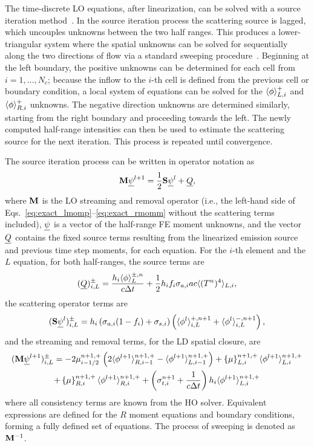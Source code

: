 The time-discrete LO equations, after linearization, can be solved with a source iteration
method~\cite{lewis,morel_dsa,mcclarren_notes}.  In the source iteration
process the scattering source is lagged, which
uncouples unknowns between the two half ranges.  This produces a lower-triangular
system where the spatial unknowns can be solved for sequentially along the two directions of flow via a
standard sweeping procedure~\cite{lewis,morel_ldtrt}.  Beginning at the left boundary, the
positive unknowns can be determined for each cell from $i=1,\ldots,N_c$; because the
inflow to the $i$-th cell is defined from the previous cell or boundary condition, a local system
of equations can be solved for the $\langle \phi \rangle_{L,i}^+$ and $\langle \phi \rangle_{R,i}^+$ unknowns.
The negative direction unknowns are
determined similarly, starting from the
right boundary and proceeding towards the left.  The newly computed half-range
intensities can then be used to estimate the scattering source for the next iteration.  This
process is repeated until convergence.  

The source iteration process can be written in operator notation as
\begin{equation}
    \mathbf{M} \underline{\psi}^{l+1} = \frac{1}{2}\mathbf{S}\underline{\psi}^{l} + \underline{Q},
\end{equation}
where $\mathbf{M}$ is the LO streaming and removal operator (i.e., the left-hand side of
Eqs.~\eqref{eq:exact_lmomp}--\eqref{eq:exact_rmomm} without the scattering terms
included), $\underline{\psi}$ is a vector of the half-range FE moment unknowns, and the vector
$\underline{Q}$ contains the fixed source terms resulting from the linearized emission source and previous
time step moments, for each equation.  For the $i$-th element and the $L$
equation, for both half-ranges, the source terms are
\begin{equation}
    (\underline{Q})_{i,L}^\pm = \frac{h_i\langle \phi \rangle_L^{\pm,n}}{c\Delta t} + \frac{1}{2}h_if_i \sigma_{a,i} a c \langle 
        (T^{n})^4 \rangle_{L,i},
\end{equation}
the scattering operator terms are
\begin{equation}
    (\mathbf{S} \underline{\psi}^l)^{\pm}_{i,L} = h_i\left(\sigma_{a,i} (1-f_i) + \sigma_{s,i}\right)
    \left(\langle  \phi^l \rangle_{i,L}^{+,n+1} + \langle  \phi^l \rangle_{i,L}^{-,n+1}\right),
\end{equation}
and the streaming and removal terms, for the LD spatial closure, are
\begin{multline}
    (\mathbf{M} \underline{\psi}^{l+1})^{\pm}_{i,L} = 
    -2{\mu}_{i-1/2}^{n+1,+} \left(2\langle \phi^{l+1} \rangle_{R,i-1}^{n+1,+} -
    \langle \phi^{l+1} \rangle_{L,i-1}^{n+1,+} \right) +  \left\{ \mu \right\}_{L,i}^{n+1,+}
    \langle \phi^{l+1} \rangle_{L,i}^{n+1,+} \\
  +  \left\{ \mu \right\}_{R,i}^{n+1,+}
  \langle \phi^{l+1} \rangle_{R,i}^{n+1,+} +  \left(\sigma_{t,i}^{n+1}+\frac{1}{c \Delta t} \right) h_i 
  \langle \phi^{l+1} \rangle_{L,i}^{n+1,+}
\end{multline}
where all consistency terms are known from the HO solver.
Equivalent expressions are defined for the $R$ moment equations and boundary conditions,
forming a fully defined set of equations.  The process of sweeping is denoted as $\mathbf{M}^{-1}$.

